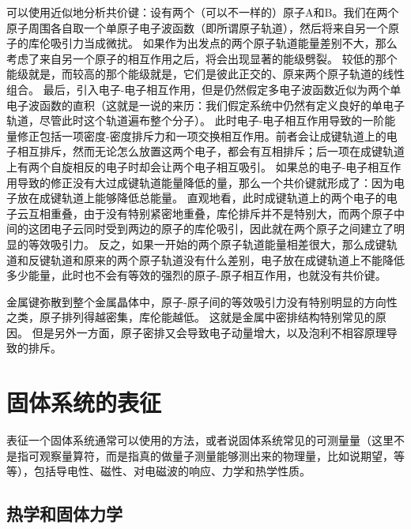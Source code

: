 可以使用近似地分析共价键：设有两个（可以不一样的）原子A和B。我们在两个原子周围各自取一个单原子电子波函数（即所谓原子轨道），然后将来自另一个原子的库伦吸引力当成微扰。
如果作为出发点的两个原子轨道能量差别不大，那么考虑了来自另一个原子的相互作用之后，将会出现显著的能级劈裂。
较低的那个能级就是，而较高的那个能级就是，它们是彼此正交的、原来两个原子轨道的线性组合。
最后，引入电子-电子相互作用，但是仍然假定多电子波函数近似为两个单电子波函数的直积（这就是一说的来历：我们假定系统中仍然有定义良好的单电子轨道，尽管此时这个轨道遍布整个分子）。
此时电子-电子相互作用导致的一阶能量修正包括一项密度-密度排斥力和一项交换相互作用。前者会让成键轨道上的电子相互排斥，然而无论怎么放置这两个电子，都会有互相排斥；后一项在成键轨道上有两个自旋相反的电子时却会让两个电子相互吸引。
如果总的电子-电子相互作用导致的修正没有大过成键轨道能量降低的量，那么一个共价键就形成了：因为电子放在成键轨道上能够降低总能量。
直观地看，此时成键轨道上的两个电子的电子云互相重叠，由于没有特别紧密地重叠，库伦排斥并不是特别大，而两个原子中间的这团电子云同时受到两边的原子的库伦吸引，因此就在两个原子之间建立了明显的等效吸引力。
反之，如果一开始的两个原子轨道能量相差很大，那么成键轨道和反键轨道和原来的两个原子轨道没有什么差别，电子放在成键轨道上不能降低多少能量，此时也不会有等效的强烈的原子-原子相互作用，也就没有共价键。

金属键弥散到整个金属晶体中，原子-原子间的等效吸引力没有特别明显的方向性之类，原子排列得越密集，库伦能越低。
这就是金属中密排结构特别常见的原因。
但是另外一方面，原子密排又会导致电子动量增大，以及泡利不相容原理导致的排斥。

\section{固体系统的表征}

表征一个固体系统通常可以使用的方法，或者说固体系统常见的可测量量（这里不是指可观察量算符，而是指真的做量子测量能够测出来的物理量，比如说期望，等等），包括导电性、磁性、对电磁波的响应、力学和热学性质。

\subsection{热学和固体力学}

